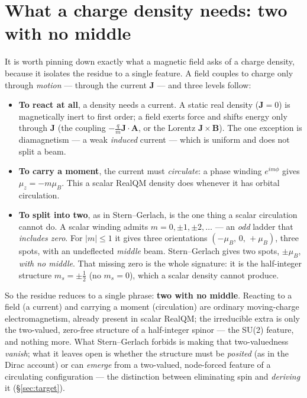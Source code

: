 \documentclass[11pt]{article}
\begin{document}
\section{What a charge density needs: two with no middle}
\label{sec:twomiddle}

It is worth pinning down exactly what a magnetic field asks of a charge density, because it isolates the
residue to a single feature. A field couples to charge only through \emph{motion} --- through the current
$\mathbf J$ --- and three levels follow:
\begin{itemize}
\item \textbf{To react at all}, a density needs a current. A static real density ($\mathbf J=0$) is
magnetically inert to first order; a field exerts force and shifts energy only through $\mathbf J$ (the
coupling $-\tfrac{q}{m}\mathbf J\cdot\mathbf A$, or the Lorentz $\mathbf J\times\mathbf B$). The one
exception is diamagnetism --- a weak \emph{induced} current --- which is uniform and does not split a
beam.
\item \textbf{To carry a moment}, the current must \emph{circulate}: a phase winding $e^{im\phi}$ gives
$\mu_z=-m\mu_B$. This a scalar RealQM density does whenever it has orbital circulation.
\item \textbf{To split into two}, as in Stern--Gerlach, is the one thing a scalar circulation cannot do. A
scalar winding admits $m=0,\pm1,\pm2,\dots$ --- an \emph{odd} ladder that \emph{includes zero}. For
$|m|\le1$ it gives three orientations $(-\mu_B,\,0,\,+\mu_B)$, three spots, with an undeflected
\emph{middle} beam. Stern--Gerlach gives two spots, $\pm\mu_B$, \emph{with no middle}. That missing zero
is the whole signature: it is the half-integer structure $m_s=\pm\tfrac12$ (no $m_s=0$), which a scalar
density cannot produce.
\end{itemize}
So the residue reduces to a single phrase: \textbf{two with no middle}. Reacting to a field (a current)
and carrying a moment (circulation) are ordinary moving-charge electromagnetism, already present in scalar
RealQM; the irreducible extra is only the two-valued, zero-free structure of a half-integer spinor --- the
SU(2) feature, and nothing more. What Stern--Gerlach forbids is making that two-valuedness \emph{vanish};
what it leaves open is whether the structure must be \emph{posited} (as in the Dirac account) or can
\emph{emerge} from a two-valued, node-forced feature of a circulating configuration --- the distinction
between eliminating spin and \emph{deriving} it (\S\ref{sec:target}).
\end{document}
